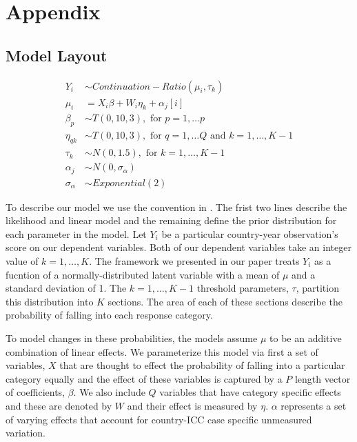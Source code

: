 \renewcommand{\thefigure}{A\arabic{figure}}
\setcounter{figure}{0}
\renewcommand{\thetable}{A.\arabic{table}}
\setcounter{table}{0}
\renewcommand{\thesection}{A.\arabic{section}}
\setcounter{section}{0}

\section*{Appendix}

\subsection*{Model Layout}

\begin{align*}
  Y_{i} &\sim Continuation-Ratio(\mu_{i}, \tau_{k}) \\
  \mu_{i} &= X_{i} \beta + W_{i}\eta_{k} + \alpha_{j}[i] \\
  \beta_{p} &\sim T(0, 10, 3), \text{ for } p = 1, \ldots p \\
  \eta_{qk} &\sim T(0, 10, 3), \text{ for } q = 1, \ldots Q \text{ and } k =1, \ldots, K-1 \\
  \tau_{k} &\sim N(0, 1.5), \text{ for } k = 1, \ldots, K-1 \\
  \alpha_{j} &\sim N(0, \sigma_{\alpha}) \\
  \sigma_{\alpha} &\sim Exponential(2)
\end{align*}

To describe our model we use the convention in \citet{mcelreath2016statistical}. The frist two lines describe the likelihood and linear model and the remaining define the prior distribution for each parameter in the model. Let $Y_{i}$ be a particular country-year observation's score on our dependent variables. Both of our dependent variables take an integer value of $k=1, \ldots, K$. The framework we presented in our paper treats $Y_{i}$ as a fucntion of a normally-distributed latent variable with a mean of $\mu$ and a standard deviation of 1. The $k=1, \ldots, K-1$ threshold parameters, $\tau$, partition this distribution into $K$ sections. The area of each of these sections describe the probability of falling into each response category.

To model changes in these probabilities, the models assume $\mu$ to be an additive combination of linear effects. We parameterize this model via first a set of variables, $X$ that are thought to effect the probability of falling into a particular category equally and the effect of these variables is captured by a $P$ length vector of coefficients, $\beta$. We also include $Q$ variables that have category specific effects and these are denoted by $W$ and their effect is measured by $\eta$. $\alpha$ represents a set of varying effects that account for country-ICC case specific unmeasured variation.

